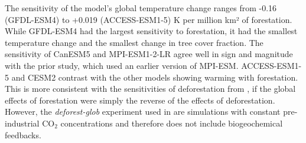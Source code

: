 \documentclass[draft]{agujournal2019}
\begin{document}
The sensitivity of the model's global temperature change ranges from -0.16 (GFDL-ESM4) to +0.019 (ACCESS-ESM1-5) K per million km² of forestation.
While GFDL-ESM4 had the largest sensitivity to forestation, it had the smallest temperature change and the smallest change in tree cover fraction.
The sensitivity of CanESM5 and MPI-ESM1-2-LR agree well in sign and magnitude with the prior  study, which used an earlier version of MPI-ESM.
ACCESS-ESM1-5 and CESM2 contrast with the other models showing warming with forestation.
This is more consistent with the sensitivities of deforestation from , if the global effects of forestation were simply the reverse of the effects of deforestation.
However, the \textit{deforest-glob} experiment used in  are simulations with constant pre-industrial CO$_2$ concentrations and therefore does not include biogeochemical feedbacks.
\end{document}
